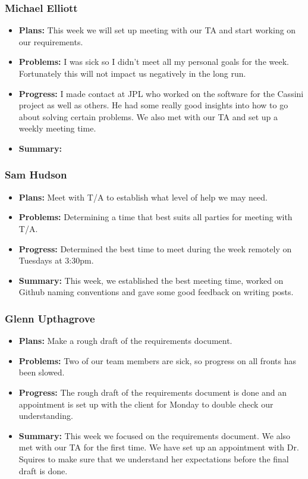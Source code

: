 \documentclass[onecolumn, draftclsnofoot,10pt, compsoc]{IEEEtran}
\begin{document}
\subsubsection{Michael Elliott}
\begin {itemize}
\item \textbf{Plans: }
  This week we will set up meeting with our TA and start working on our requirements.
\item \textbf{Problems: }
  I was sick so I didn't meet all my personal goals for the week. Fortunately this will not impact us negatively in the long run.
\item \textbf{Progress: }
  I made contact at JPL who worked on the software for the Cassini project as well as others. He had some really good insights into how to go about solving certain problems. We also met with our TA and set up a weekly meeting time.
\item \textbf{Summary: }
\end {itemize}
\subsubsection{Sam Hudson}
\begin {itemize}
\item \textbf{Plans: }Meet with T/A to establish what level of help we may need.
\item \textbf{Problems: }Determining a time that best suits all parties for meeting with T/A.
\item \textbf{Progress: }Determined the best time to meet during the week remotely on Tuesdays at 3:30pm.
\item \textbf{Summary: }This week, we established the best meeting time, worked on Github naming conventions and gave some good feedback on writing posts.
\end {itemize}
\subsubsection{Glenn Upthagrove}
\begin {itemize}
 \item \textbf{Plans: }Make a rough draft of the requirements document.
 \item \textbf{Problems: }Two of our team members are sick, so progress on all fronts has been slowed.
 \item \textbf{Progress: }The rough draft of the requirements document is done and an appointment is set up with the client for Monday to double check our understanding. 
 \item \textbf{Summary: }This week we focused on the requirements document. We also met with our TA for the first time. We have set up an appointment with Dr. Squires to make sure that we understand her expectations before the final draft is done.  
\end {itemize}
\end{document}
